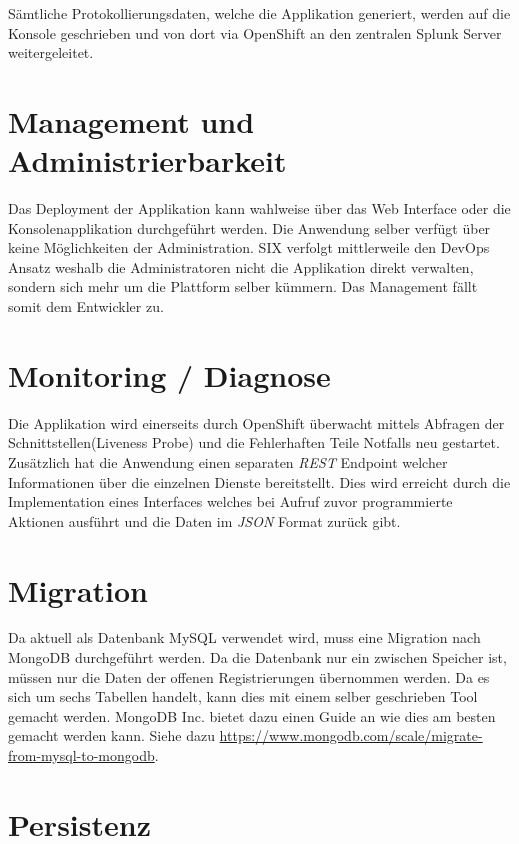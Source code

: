 Sämtliche Protokollierungsdaten, welche die Applikation generiert, werden auf die Konsole geschrieben und von dort via OpenShift an den zentralen Splunk Server weitergeleitet.

\section{Management und Administrierbarkeit}

Das Deployment der Applikation kann wahlweise über das Web Interface oder die Konsolenapplikation durchgeführt werden. Die Anwendung selber verfügt über keine Möglichkeiten der Administration. SIX verfolgt mittlerweile den DevOps Ansatz weshalb die Administratoren nicht die Applikation direkt verwalten, sondern sich mehr um die Plattform selber kümmern. Das Management fällt somit dem Entwickler zu. 

\section{Monitoring / Diagnose}

Die Applikation wird einerseits durch OpenShift überwacht mittels Abfragen der Schnittstellen(Liveness Probe) und die Fehlerhaften Teile Notfalls neu gestartet. Zusätzlich hat die Anwendung einen separaten \textit{\gls{REST}} Endpoint welcher Informationen über die einzelnen Dienste bereitstellt. Dies wird erreicht durch die Implementation eines Interfaces welches bei Aufruf zuvor programmierte Aktionen ausführt und die Daten im \textit{\gls{JSON}} Format zurück gibt.

\section{Migration}

Da aktuell als Datenbank MySQL verwendet wird, muss eine Migration nach MongoDB durchgeführt werden. Da die Datenbank nur ein zwischen Speicher ist, müssen nur die Daten der offenen Registrierungen übernommen werden. Da es sich um sechs Tabellen handelt, kann dies mit einem selber geschrieben Tool gemacht werden. MongoDB Inc. bietet dazu einen Guide an wie dies am besten gemacht werden kann. Siehe dazu \url{https://www.mongodb.com/scale/migrate-from-mysql-to-mongodb}.

\section{Persistenz}
\label{persistenz}

